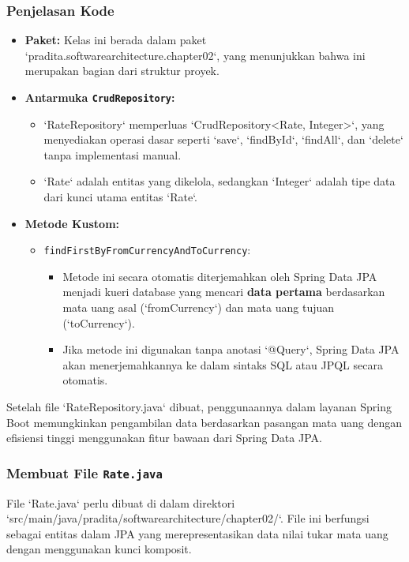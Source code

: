 \subsubsection{Penjelasan Kode}
\begin{itemize}
\item \textbf{Paket:} Kelas ini berada dalam paket `pradita.softwarearchitecture.chapter02`, yang menunjukkan bahwa ini merupakan bagian dari struktur proyek.
\item \textbf{Antarmuka \texttt{CrudRepository}:} 
\begin{itemize}
\item `RateRepository` memperluas `CrudRepository<Rate, Integer>`, yang menyediakan operasi dasar seperti `save`, `findById`, `findAll`, dan `delete` tanpa implementasi manual.
\item `Rate` adalah entitas yang dikelola, sedangkan `Integer` adalah tipe data dari kunci utama entitas `Rate`.
\end{itemize}
\item \textbf{Metode Kustom:}
\begin{itemize}
\item \texttt{findFirstByFromCurrencyAndToCurrency}:  
\begin{itemize}
	\item Metode ini secara otomatis diterjemahkan oleh Spring Data JPA menjadi kueri database yang mencari \textbf{data pertama} berdasarkan mata uang asal (`fromCurrency`) dan mata uang tujuan (`toCurrency`).
	\item Jika metode ini digunakan tanpa anotasi `@Query`, Spring Data JPA akan menerjemahkannya ke dalam sintaks SQL atau JPQL secara otomatis.
\end{itemize}
\end{itemize}
\end{itemize}

Setelah file `RateRepository.java` dibuat, penggunaannya dalam layanan Spring Boot memungkinkan pengambilan data berdasarkan pasangan mata uang dengan efisiensi tinggi menggunakan fitur bawaan dari Spring Data JPA.


\subsubsection{Membuat File \texttt{Rate.java}}
File `Rate.java` perlu dibuat di dalam direktori `src/main/java/pradita/softwarearchitecture/chapter02/`. File ini berfungsi sebagai entitas dalam JPA yang merepresentasikan data nilai tukar mata uang dengan menggunakan kunci komposit.

